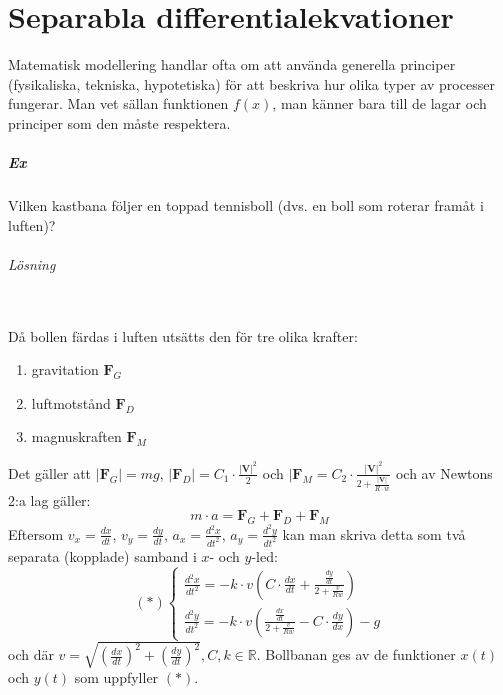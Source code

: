 \chapter*{Separabla differentialekvationer}
Matematisk modellering handlar ofta om att använda generella principer\\
(fysikaliska, tekniska, hypotetiska) för att beskriva hur olika typer av processer fungerar.
Man vet sällan funktionen $f(x)$, man känner bara till de lagar och principer som den måste respektera.

\paragraph*{Ex} Vilken kastbana följer en toppad tennisboll (dvs. en boll som roterar framåt i luften)?
\subparagraph{Lösning}~\\
Då bollen färdas i luften utsätts den för tre olika krafter:
\begin{enumerate}
    \item gravitation $\bm{F}_G$
    \item luftmotstånd $\bm{F}_D$
    \item magnuskraften $\bm{F}_M$
\end{enumerate}
Det gäller att $|\bm{F}_G|=mg$, $|\bm{F}_D|=C_1\cdot\frac{|\bm{V}|^2}{2}$ och $|\bm{F}_M=C_2\cdot\frac{|\bm{V}|^2}{2+\frac{|\bm{V}|}{R\cdot w}}$ och av Newtons 2:a lag gäller:
\begin{equation*}
    m\cdot a=\bm{F}_G+\bm{F}_D+\bm{F}_M
\end{equation*}
Eftersom $v_x=\frac{dx}{dt}$, $v_y=\frac{dy}{dt}$, $a_x=\frac{d^2x}{dt^2}$, $a_y=\frac{d^2y}{dt^2}$ kan man skriva detta som två separata (kopplade) samband i $x$- och $y$-led:
\begin{equation*}
    (*)\left\lbrace
    \begin{matrix}
        \frac{d^2x}{dt^2}=-k\cdot v(C\cdot\frac{dx}{dt}+\frac{\frac{dy}{dt}}{2+\frac{v}{Rw}}) \\
        \frac{d^2y}{dt^2}=-k\cdot v(\frac{\frac{dx}{dt}}{2+\frac{v}{Rw}}-C\cdot\frac{dy}{dx})-g
    \end{matrix}
    \right.
\end{equation*}
och där $v=\sqrt{(\frac{dx}{dt})^2+(\frac{dy}{dt})^2}, C,k\in\mathbb{R}$.
Bollbanan ges av de funktioner $x(t)$ och $y(t)$ som uppfyller $(*)$.
